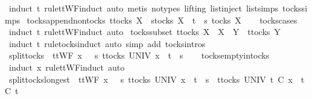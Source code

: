 \ {\isacharparenleft}induct\ t\ rule{\isacharcolon}ttWF{\isachardot}induct{\isacharcomma}\ auto{\isacharcomma}\ metis\ {\isacharparenleft}no{\isacharunderscore}types{\isacharcomma}\ lifting{\isacharparenright}\ list{\isachardot}inject\ list{\isachardot}simps{\isacharparenleft}{}{\isacharparenright}\ tocks{\isachardot}simps{\isacharparenright}%
\endisatagproof
{\isafoldproof}%
%
\isadelimproof
\isanewline
%
\endisadelimproof
\isanewline
{}\isamarkupfalse%
\ tocks{\isacharunderscore}append{\isacharunderscore}nontocks{\isacharcolon}\ {\isachardoublequoteopen}t{\isasymin}tocks\ X\ {\isasymLongrightarrow}\ s{\isasymnotin}tocks\ X\ {\isasymLongrightarrow}\ t\ {\isacharat}\ s\ {\isasymnotin}tocks\ X{\isachardoublequoteclose}\isanewline
%
\isadelimproof
\ \ %
\endisadelimproof
%
\isatagproof
{}\isamarkupfalse%
\ tocks{\isachardot}cases\ \isamarkupfalse%
\ {\isacharparenleft}induct\ t\ rule{\isacharcolon}ttWF{\isachardot}induct{\isacharcomma}\ auto{\isacharparenright}%
\endisatagproof
{\isafoldproof}%
%
\isadelimproof
\isanewline
%
\endisadelimproof
\isanewline
{}\isamarkupfalse%
\ tocks{\isacharunderscore}subset{\isacharcolon}\ {\isachardoublequoteopen}t{\isasymin}tocks\ X\ {\isasymLongrightarrow}\ X\ {\isasymsubseteq}\ Y\ {\isasymLongrightarrow}\ t{\isasymin}tocks\ Y{\isachardoublequoteclose}\isanewline
%
\isadelimproof
\ \ %
\endisadelimproof
%
\isatagproof
{}\isamarkupfalse%
\ {\isacharparenleft}induct\ t\ rule{\isacharcolon}tocks{\isachardot}induct{\isacharcomma}\ auto\ simp\ add{\isacharcolon}\ tocks{\isachardot}intros{\isacharparenright}%
\endisatagproof
{\isafoldproof}%
%
\isadelimproof
\isanewline
%
\endisadelimproof
\isanewline
{}\isamarkupfalse%
\ split{\isacharunderscore}tocks{\isacharcolon}\ \ {\isachardoublequoteopen}ttWF\ x\ {\isasymLongrightarrow}\ {\isasymexists}\ s{\isachardot}\ {\isasymexists}t{\isasymin}tocks\ UNIV{\isachardot}\ x\ {\isacharequal}\ t\ {\isacharat}\ s{\isachardoublequoteclose}\isanewline
%
\isadelimproof
\ \ %
\endisadelimproof
%
\isatagproof
{}\isamarkupfalse%
\ tocks{\isachardot}empty{\isacharunderscore}in{\isacharunderscore}tocks\ \isamarkupfalse%
\ {\isacharparenleft}induct\ x\ rule{\isacharcolon}ttWF{\isachardot}induct{\isacharcomma}\ auto{\isacharparenright}%
\endisatagproof
{\isafoldproof}%
%
\isadelimproof
\isanewline
%
\endisadelimproof
\isanewline
{}\isamarkupfalse%
\ split{\isacharunderscore}tocks{\isacharunderscore}longest{\isacharcolon}\ \ {\isachardoublequoteopen}ttWF\ x\ {\isasymLongrightarrow}\ {\isasymexists}\ s{\isachardot}\ {\isasymexists}t{\isasymin}tocks\ UNIV{\isachardot}\ x\ {\isacharequal}\ t\ {\isacharat}\ s\ {\isasymand}\ {\isacharparenleft}{\isasymforall}t{\isacharprime}{\isasymin}tocks\ UNIV{\isachardot}\ t{\isacharprime}\ {\isasymle}\isactrlsub C\ x\ {\isasymlongrightarrow}\ t{\isacharprime}\ {\isasymle}\isactrlsub C\ t{\isacharparenright}{\isachardoublequoteclose}\isanewline
